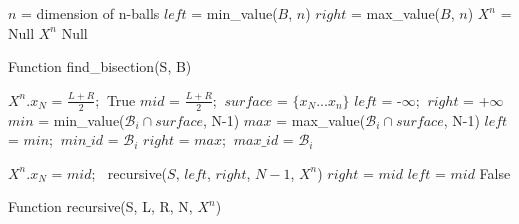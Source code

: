 \begin{algorithm}[H]
\begin{algorithmic}[1]
\Input
\EndInput
\Output
\EndOutput

\State $n$ = dimension of n-balls
\State $left$ = min\_value($B$, $n$) 
\State $right$ = max\_value($B$, $n$) 
\State $X^n$ = Null
    \State \Return $X^n$
\Else
    \State \Return Null
\EndIf
\end{algorithmic}
\caption{Function find\_bisection(S, B)}
\label{algo:find_bisection_function}
\end{algorithm}

\begin{algorithm}
\begin{algorithmic}[1]
\Input
\EndInput
\Output
\EndOutput
{}
    \State $X^n.x_N$ = $\frac{L+R}{2}$; $\ $\Return True
\EndIf
{}
    \State $mid$ = $\frac{L+R}{2}$; $\ surface$ = $\{x_{N}...x_{n}\}$
    \State $left$ = -$\infty$; $\ right$ = +$\infty$
        \State $min$ = min\_value($\mathcal{B}_i \cap surface$, N-1)
        \State $max$ = max\_value($\mathcal{B}_i \cap surface$, N-1)
            \State $left$ = $min$; $\ min\_id$ = $\mathcal{B}_i$
        \EndIf
            \State $right$ = $max$; $\ max\_id$ = $\mathcal{B}_i$
        \EndIf
    \EndFor
    
        \State $X^n.x_N$ = $mid$; $\ $
        \Return recursive($S$, $left$, $right$, $N-1$, $X^n$)
        \State $right$ = $mid$
    \Else
        \State $left$ = $mid$
    \EndIf
\EndWhile
\State \Return False
\end{algorithmic}
\caption{Function recursive(S, L, R, N, $X^n$)}
\label{algo:recursive}
\end{algorithm}
